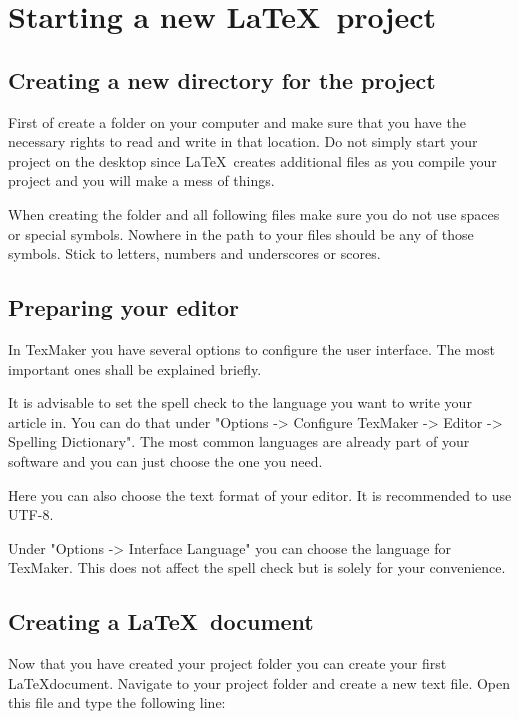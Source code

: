 \documentclass[]{tufte-book} %
\begin{document}
\chapter{Starting a new \LaTeX\ project}


\section{Creating a new directory for the project}

First of create a folder on your computer and make sure that you have the necessary rights to read and write in that location. Do not simply start your project on the desktop since \LaTeX\ creates additional files as you compile your project and you will make a mess of things.
 
When creating the folder and all following files make sure you do not use spaces or special symbols. Nowhere in the path to your files should be any of those symbols. Stick to letters, numbers and underscores or scores. 


\section{Preparing your editor}

In TexMaker you have several options to configure the user interface. The most important ones shall be explained briefly. 

It is advisable to set the spell check to the language you want to write your article in. You can do that under "Options -> Configure TexMaker -> Editor -> Spelling Dictionary". The most common languages are already part of your software and you can just choose the one you need.  

Here you can also choose the text format of your editor. It is recommended to use UTF-8.

Under "Options -> Interface Language" you can choose the language for TexMaker. This does not affect the spell check but is solely for your convenience.  


\section{Creating a \LaTeX\ document}

Now that you have created your project folder you can create your first \LaTeX document. Navigate to your project folder and create a new text file. Open this file and type the following line:\\[5pt]
\end{document}

